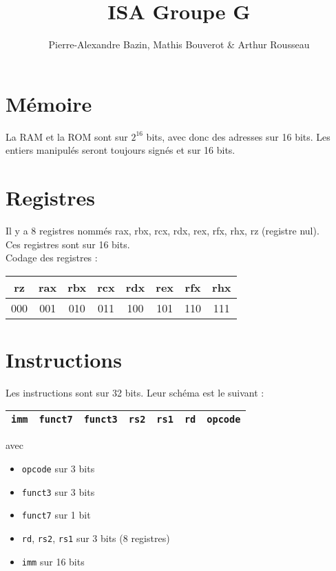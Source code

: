 \documentclass[a4paper]{article}
\title{ISA Groupe G}
\author{Pierre-Alexandre Bazin, Mathis Bouverot \& Arthur Rousseau}
\date{}
\begin{document}
    \maketitle
    \section{Mémoire}
    La RAM et la ROM sont sur \(2^{16}\) bits, avec donc des adresses sur 16 bits. Les entiers manipulés seront toujours signés et sur 16 bits.
    
    \section{Registres}
    Il y a 8 registres nommés rax, rbx, rcx, rdx, rex, rfx, rhx, rz (registre nul).\\
    Ces registres sont sur 16 bits.\\
    Codage des registres :

    \begin{tabular}{|c|c|c|c|c|c|c|c|}
        \hline
        rz  & rax & rbx & rcx & rdx & rex & rfx & rhx \\
        \hline
        000 & 001 & 010 & 011 & 100 & 101 & 110 & 111 \\
        \hline  
    \end{tabular}

    \section{Instructions}
    Les instructions sont sur 32 bits. Leur schéma est le suivant :

    \begin{tabular}{|c|c|c|c|c|c|c|}
        \hline
        \texttt{imm} & \texttt{funct7} & \texttt{funct3} & \texttt{rs2} & \texttt{rs1} & \texttt{rd} & \texttt{opcode} \\
        \hline
    \end{tabular}

    avec \begin{itemize}
        \item \texttt{opcode} sur 3 bits
        \item \texttt{funct3} sur 3 bits
        \item \texttt{funct7} sur 1 bit 
        \item \texttt{rd}, \texttt{rs2}, \texttt{rs1} sur 3 bits (8 registres)
        \item \texttt{imm} sur 16 bits
    \end{itemize}
\end{document}
